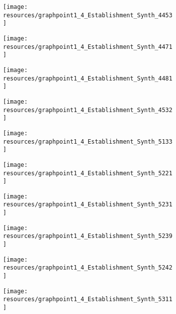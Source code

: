 \documentclass[12pt]{article}
\begin{document}
\begin{figure}[H]
	\centering
	\begin{subfigure}[b]{0.4\textwidth}
	    \texttt{[image: resources/graphpoint1\_4\_Establishment\_Synth\_4453]}
	\end{subfigure}
	\begin{subfigure}[b]{0.4\textwidth}
	    \texttt{[image: resources/graphpoint1\_4\_Establishment\_Synth\_4471]}
	\end{subfigure}
\end{figure}

\begin{figure}[H]
	\centering
	\begin{subfigure}[b]{0.4\textwidth}
	    \texttt{[image: resources/graphpoint1\_4\_Establishment\_Synth\_4481]}
	\end{subfigure}
	\begin{subfigure}[b]{0.4\textwidth}
	    \texttt{[image: resources/graphpoint1\_4\_Establishment\_Synth\_4532]}
	\end{subfigure}
\end{figure}

\begin{figure}[H]
	\centering
	\begin{subfigure}[b]{0.4\textwidth}
	    \texttt{[image: resources/graphpoint1\_4\_Establishment\_Synth\_5133]}
	\end{subfigure}
	\begin{subfigure}[b]{0.4\textwidth}
	    \texttt{[image: resources/graphpoint1\_4\_Establishment\_Synth\_5221]}
	\end{subfigure}
\end{figure}

\begin{figure}[H]
	\centering
	\begin{subfigure}[b]{0.4\textwidth}
	    \texttt{[image: resources/graphpoint1\_4\_Establishment\_Synth\_5231]}
	\end{subfigure}
	\begin{subfigure}[b]{0.4\textwidth}
	    \texttt{[image: resources/graphpoint1\_4\_Establishment\_Synth\_5239]}
	\end{subfigure}
\end{figure}

\begin{figure}[H]
	\centering
	\begin{subfigure}[b]{0.4\textwidth}
	    \texttt{[image: resources/graphpoint1\_4\_Establishment\_Synth\_5242]}
	\end{subfigure}
	\begin{subfigure}[b]{0.4\textwidth}
	    \texttt{[image: resources/graphpoint1\_4\_Establishment\_Synth\_5311]}
	\end{subfigure}
\end{figure}
\end{document}
